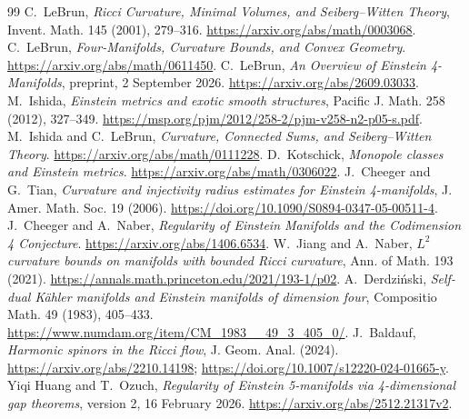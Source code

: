 \documentclass[11pt,a4paper]{article}
\theoremstyle{definition}
\theoremstyle{remark}
\numberwithin{equation}{section}
\begin{document}
\begin{thebibliography}{99}
 C.~LeBrun, \emph{Ricci Curvature, Minimal Volumes, and
Seiberg--Witten Theory}, Invent. Math. 145 (2001), 279--316.
\url{https://arxiv.org/abs/math/0003068}.
 C.~LeBrun, \emph{Four-Manifolds, Curvature Bounds,
and Convex Geometry}. \url{https://arxiv.org/abs/math/0611450}.
 C.~LeBrun, \emph{An Overview of Einstein
4-Manifolds}, preprint, 2 September 2026.
\url{https://arxiv.org/abs/2609.03033}.
 M.~Ishida, \emph{Einstein metrics and exotic smooth
structures}, Pacific J. Math. 258 (2012), 327--349.
\url{https://msp.org/pjm/2012/258-2/pjm-v258-n2-p05-s.pdf}.
 M.~Ishida and C.~LeBrun, \emph{Curvature, Connected Sums,
and Seiberg--Witten Theory}. \url{https://arxiv.org/abs/math/0111228}.
 D.~Kotschick, \emph{Monopole classes and Einstein
metrics}. \url{https://arxiv.org/abs/math/0306022}.
 J.~Cheeger and G.~Tian, \emph{Curvature and injectivity
radius estimates for Einstein 4-manifolds}, J. Amer. Math. Soc. 19 (2006).
\url{https://doi.org/10.1090/S0894-0347-05-00511-4}.
 J.~Cheeger and A.~Naber, \emph{Regularity of Einstein
Manifolds and the Codimension 4 Conjecture}.
\url{https://arxiv.org/abs/1406.6534}.
 W.~Jiang and A.~Naber, \emph{$L^2$ curvature bounds on
manifolds with bounded Ricci curvature}, Ann. of Math. 193 (2021).
\url{https://annals.math.princeton.edu/2021/193-1/p02}.
 A.~Derdzi\'nski, \emph{Self-dual K\"ahler manifolds and
Einstein manifolds of dimension four}, Compositio Math. 49 (1983), 405--433.
\url{https://www.numdam.org/item/CM_1983__49_3_405_0/}.
 J.~Baldauf, \emph{Harmonic spinors in the Ricci flow},
J. Geom. Anal. (2024).
\url{https://arxiv.org/abs/2210.14198};
\url{https://doi.org/10.1007/s12220-024-01665-y}.
 Yiqi Huang and T.~Ozuch, \emph{Regularity of Einstein
5-manifolds via 4-dimensional gap theorems}, version 2, 16 February 2026.
\url{https://arxiv.org/abs/2512.21317v2}.
\end{thebibliography}
\end{document}
